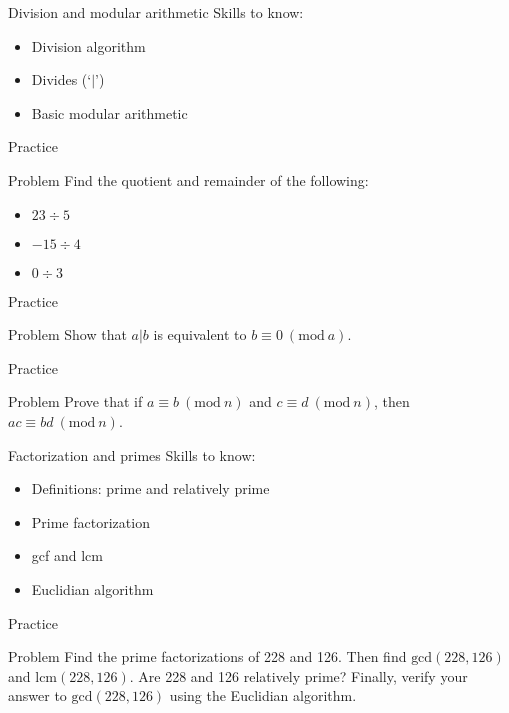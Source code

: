 \documentclass[dvipsnames,t]{beamer}
\newcommand{\Mod}[1]{\ (\mathrm{mod}\ #1)}
\begin{document}
\begin{frame}{Division and modular arithmetic}
Skills to know:
\begin{itemize}
    \item Division algorithm
    \item Divides (`$\mid$')
    \item Basic modular arithmetic
\end{itemize}
\end{frame}
\begin{frame}{Practice}
\begin{block}{Problem}
Find the quotient and remainder of the following:
\begin{itemize}
    \item $23\div 5$
    \item $-15\div 4$
    \item $0 \div 3$
\end{itemize}
\end{block}
\end{frame}
\begin{frame}{Practice}
\begin{block}{Problem}
Show that $a|b$ is equivalent to $b \equiv 0 \Mod{a}$.
\end{block}
\end{frame}
\begin{frame}{Practice}
\begin{block}{Problem}
Prove that if $a \equiv b \Mod{n}$ and $c \equiv d \Mod{n}$, then $ac \equiv bd \Mod{n}$.
\end{block}
\end{frame}

\begin{frame}{Factorization and primes}
Skills to know:
\begin{itemize}
    \item Definitions: prime and relatively prime
    \item Prime factorization
    \item gcf and lcm
    \item Euclidian algorithm
\end{itemize}
\end{frame}

\begin{frame}{Practice}
\begin{block}{Problem}
Find the prime factorizations of 228 and 126. Then find $\text{gcd}(228,126)$ and $\text{lcm}(228,126)$. Are 228 and 126 relatively prime? Finally, verify your answer to $\text{gcd}(228,126)$ using the Euclidian algorithm.
\end{block}
\end{frame}
\end{document}
